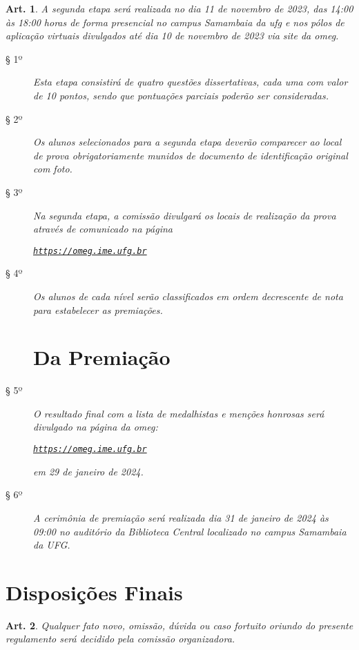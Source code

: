 \documentclass[a4paper,12pt]{article}
\newtheorem{article}{Art.}
\def\url{https://omeg.ime.ufg.br}
\def\homepage{\href{\url}{\texttt{\url}}}
\def\year{2023}
\def\phaseTwo{11 de novembro de \year}
\def\remoteBasesDisclosureDate{10 de novembro de \year}
\def\resultsFromPhaseTwo{29 de janeiro de 2024}
\def\prizesDay{31 de janeiro de 2024}
\begin{document}
\begin{article}
  A segunda etapa será realizada no dia \phaseTwo, das 14:00 às 18:00 horas
  de forma presencial no campus Samambaia da \acrshort{ufg} e nos pólos de
  aplicação virtuais divulgados até dia \remoteBasesDisclosureDate{} via site
  da \acrshort{omeg}.
  \begin{description}
    \item[§ 1º]
      Esta etapa consistirá de quatro questões dissertativas, cada uma com
      valor de 10 pontos, sendo que pontuações parciais poderão ser
      consideradas.
    \item[§ 2º]
      Os alunos selecionados para a segunda etapa deverão comparecer ao
      local de prova obrigatoriamente munidos de documento de identificação
      original com foto.
    \item[§ 3º]
      Na segunda etapa, a comissão divulgará os locais de realização da prova
      através de comunicado na página
      \begin{center}
        \homepage
      \end{center}
    \item[§ 4º]
      Os alunos de cada nível serão classificados em ordem decrescente de
      nota para estabelecer as premiações.

\section*{Da Premiação}

    \item[§ 5º]
      O resultado final com a lista de medalhistas e menções honrosas será
      divulgado na página da \acrshort{omeg}:
      \begin{center}
        \homepage
      \end{center}
      em \resultsFromPhaseTwo.
    \item[§ 6º]
      A cerimônia de premiação será realizada dia \prizesDay{} às 09:00 no
      auditório da Biblioteca Central localizado no campus Samambaia da UFG.
  \end{description}
\end{article}

\section*{Disposições Finais}

\begin{article}
  Qualquer fato novo, omissão, dúvida ou caso fortuito oriundo do presente
  regulamento será decidido pela comissão organizadora.
\end{article}
\end{document}
